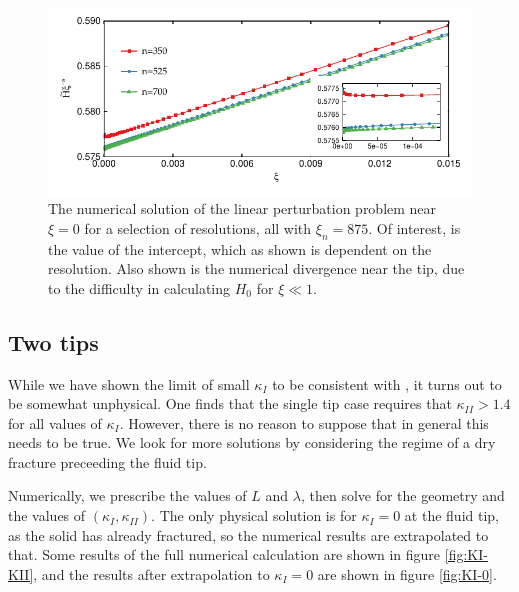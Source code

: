 \documentclass{jfm}
\begin{document}
\begin{figure}
 \centerline{
\includegraphics{./../../Graphs/linear-perturbation-plot.pdf}}
  \caption{The numerical solution of the linear perturbation problem near 
           $\xi=0$ for a selection of resolutions, all with $\xi_n = 875$. Of 
           interest, is the value of the intercept, which as shown is dependent
           on the resolution. Also shown is the numerical divergence near the 
           tip, due to the difficulty in calculating $H_0$ for $\xi \ll 1$.
           }\label{fig:lin-pert}
\end{figure}

\subsection{Two tips}
While we have shown the limit of small $\kappa_I$ to be consistent with 
\citet{Garagash}, it turns out to be somewhat unphysical. One finds that the 
single tip case requires that $\kappa_{II} > 1.4 $ for all values of 
$\kappa_{I}$. However, there is no reason to suppose that in general this needs 
to be true. We look for more solutions by considering the regime of a dry 
fracture preceeding the fluid tip.

Numerically, we prescribe the values of $L$ and $\lambda$, then solve for
the geometry and the values of $(\kappa_I,\kappa_{II})$. The only physical
solution is for $\kappa_I = 0$ at the fluid tip, as the solid has already 
fractured, so the numerical results are extrapolated
to that. Some results of the full numerical calculation are shown in figure
\ref{fig:KI-KII}, and the results after extrapolation to $\kappa_I=0$ are
shown in figure \ref{fig:KI-0}.
\end{document}
